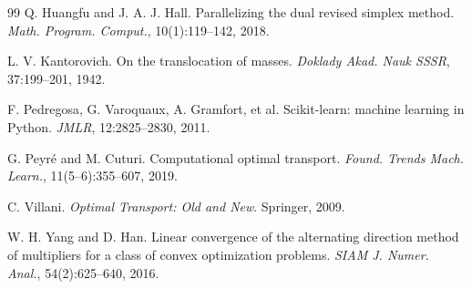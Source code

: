 \documentclass{article}
\begin{document}
\begin{thebibliography}{99}
Q. Huangfu and J. A. J. Hall. Parallelizing the dual revised simplex method.
\emph{Math. Program. Comput.}, 10(1):119--142, 2018.

L. V. Kantorovich. On the translocation of masses. \emph{Doklady Akad. Nauk SSSR},
37:199--201, 1942.

F. Pedregosa, G. Varoquaux, A. Gramfort, et al. Scikit-learn: machine learning in
Python. \emph{JMLR}, 12:2825--2830, 2011.

G. Peyr\'e and M. Cuturi. Computational optimal transport. \emph{Found. Trends Mach.
Learn.}, 11(5--6):355--607, 2019.

C. Villani. \emph{Optimal Transport: Old and New}. Springer, 2009.

W. H. Yang and D. Han. Linear convergence of the alternating direction method of
multipliers for a class of convex optimization problems. \emph{SIAM J. Numer. Anal.},
54(2):625--640, 2016.
\end{thebibliography}
\end{document}
